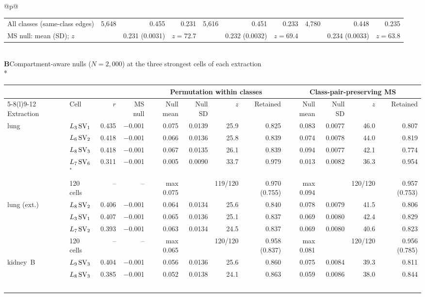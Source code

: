 \begin{longtable}{@{}p{\textwidth}@{}}
{\begin{tabular*}{\textwidth}{@{\extracolsep{\fill}}lrrrrrrrrr@{}}
\midrule
All classes (same-class edges) & 5,648 & 0.455 & 0.231 & 5,616 & 0.451 & 0.233 & 4,780 & 0.448 & 0.235 \\
MS null: mean (SD); $z$ &  & 0.231 (0.0031) & $z = 72.7$ &  & 0.232 (0.0032) & $z = 69.4$ &  & 0.234 (0.0033) & $z = 63.8$ \\
\end{tabular*}}\\
\midrule
\textbf{B}\enspace Compartment-aware nulls ($N = 2{,}000$) at the three strongest cells of each extraction\\*
{\scriptsize\begin{tabular*}{\textwidth}{@{\extracolsep{\fill}}llrrrrrrrrrr@{}}
& & & & \multicolumn{4}{c}{Permutation within classes} & \multicolumn{4}{c}{Class-pair-preserving MS} \\
\cmidrule(lr){5-8}\cmidrule(l){9-12}
Extraction & Cell & $r$ & MS null & Null mean & Null SD & $z$ & Retained & Null mean & Null SD & $z$ & Retained \\
\midrule
lung & $L_{3}\,\SV{1}$ & 0.435 & $-$0.001 & 0.075 & 0.0139 & 25.9 & 0.825 & 0.083 & 0.0077 & 46.0 & 0.807 \\
 & $L_{6}\,\SV{2}$ & 0.418 & $-$0.001 & 0.066 & 0.0136 & 25.8 & 0.839 & 0.074 & 0.0078 & 44.0 & 0.819 \\
 & $L_{8}\,\SV{3}$ & 0.418 & $-$0.001 & 0.067 & 0.0135 & 26.1 & 0.839 & 0.094 & 0.0077 & 42.1 & 0.774 \\
 & $L_{7}\,\SV{6}$$^{*}$ & 0.311 & $-$0.001 & 0.005 & 0.0090 & 33.7 & 0.979 & 0.013 & 0.0082 & 36.3 & 0.954 \\
 & 120 cells & -- & -- & max 0.075 &  & 119/120 & 0.970 (0.755) & max 0.094 &  & 120/120 & 0.957 (0.753) \\
\addlinespace[2pt]
lung (ext.) & $L_{8}\,\SV{2}$ & 0.406 & $-$0.001 & 0.064 & 0.0134 & 25.6 & 0.840 & 0.078 & 0.0079 & 41.5 & 0.806 \\
 & $L_{3}\,\SV{1}$ & 0.407 & $-$0.001 & 0.065 & 0.0136 & 25.1 & 0.837 & 0.069 & 0.0080 & 42.4 & 0.829 \\
 & $L_{7}\,\SV{2}$ & 0.393 & $-$0.001 & 0.063 & 0.0134 & 24.5 & 0.837 & 0.069 & 0.0080 & 40.6 & 0.823 \\
 & 120 cells & -- & -- & max 0.065 &  & 120/120 & 0.958 (0.837) & max 0.081 &  & 120/120 & 0.956 (0.785) \\
\addlinespace[2pt]
kidney~B & $L_{9}\,\SV{3}$ & 0.404 & $-$0.001 & 0.056 & 0.0136 & 25.6 & 0.860 & 0.075 & 0.0084 & 39.3 & 0.811 \\
 & $L_{8}\,\SV{3}$ & 0.385 & $-$0.001 & 0.052 & 0.0138 & 24.1 & 0.863 & 0.059 & 0.0086 & 38.0 & 0.844 \\
$$
\end{tabular*}}
\end{longtable}
